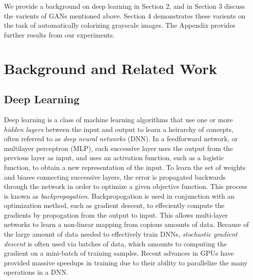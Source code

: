 \documentclass{article}
\begin{document}
\noindent We provide a background on deep learning in Section 2, and in Section 3 discuss the varients of GANs mentioned above.
Section 4 demonstrates these varients on the task of automatically colorizing grayscale images. The Appendix provides further
results from our experiments.

\section{Background and Related Work}

\subsection{Deep Learning}
Deep learning is a class of machine learning algorithms that use one or more \textit{hidden layers} between the input and output
to learn a heirarchy of concepts, often referred to as \textit{deep neural networks} (DNN).
In a feedforward network, or multilayer perceptron (MLP), each successive layer uses the output
from the previous layer as input, and uses an activation function, such as a logistic function, to obtain a new representation of the input. To
learn the set of weights and biases connecting successive layers, the error is propagated backwards through the network in order to optimize a
given objective function. This process is known as \textit{backpropogation}. Backpropogation is used in conjunction with an optimization method,
such as gradient descent, to effeciently compute the gradients by propogation from the output to input. This allows multi-layer networks to learn
a non-linear mapping from copious amounts of data. Because of the large amount of data needed to effectively train DNNs, \textit{stochastic gradient descent}
is often used via batches of data, which amounts to computing the gradient on a mini-batch of training samples. Recent advances in GPUs have
provided massive speedups in training due to their ability to parallelize the many operations in a DNN. \newline

\end{document}
